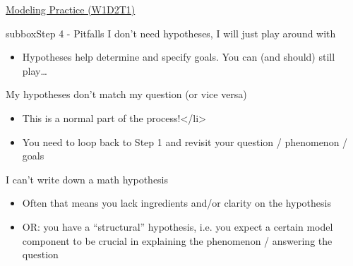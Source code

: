 \begin{textbox}{\href{https://compneuro.neuromatch.io/tutorials/W1D2_ModelingPractice/W1D2_Intro.html}{Modeling Practice  (W1D2T1)} }
\begin{subbox}{subbox}{Step 4 - Pitfalls }
I don’t need hypotheses, I will just play around with \begin{itemize}
    \item Hypotheses help determine and specify goals. You can (and should) still play… \end{itemize}

My hypotheses don’t match my question (or vice versa)
 \begin{itemize}
    \item This is a normal part of the process!</li>
\item You need to loop back to Step 1 and revisit your question / phenomenon / goals \end{itemize}

I can’t write down a math hypothesis
\begin{itemize}
    \item Often that means you lack ingredients and/or clarity on the hypothesis
  \item OR: you have a “structural” hypothesis, i.e. you expect a certain model component to be crucial in explaining the phenomenon / answering the question \end{itemize}

 \end{subbox}
 
 
\end{textbox}

